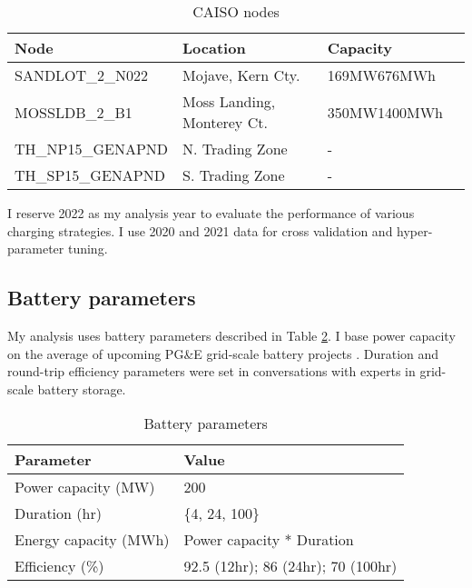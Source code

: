 \documentclass[conference]{IEEEtran}
\begin{document}
\begin{table}[htbp]
    \caption{\label{tab:caiso} CAISO nodes}
    \begin{center}
        \begin{tabular}{llll}
            \hline
            \textbf{Node} & \textbf{Location} & \textbf{Capacity} \\
            \hline
            SANDLOT\_2\_N022 & Mojave, Kern Cty. & 169MW\/676MWh \\
            MOSSLDB\_2\_B1 & Moss Landing, Monterey Ct. & 350MW\/1400MWh \\
            TH\_NP15\_GEN\-APND & N. Trading Zone & - \\
            TH\_SP15\_GEN\-APND & S. Trading Zone & - \\
            \hline
        \end{tabular}
    \end{center}
\end{table}

I reserve 2022 as my analysis year to evaluate the performance of various charging strategies. I use 2020 and 2021 data for cross validation and hyper-parameter tuning.

\subsection{Battery parameters}
My analysis uses battery parameters described in Table \ref{tab:battery}. I base power capacity on the average of upcoming PG\&E grid-scale battery projects \cite{Colthorpe} \cite{IEA}. Duration and round-trip efficiency parameters were set in conversations with experts in grid-scale battery storage. 
\begin{table}[htbp]
    \caption{\label{tab:battery} Battery parameters}
    \begin{center}
        \begin{tabular}{ll}
            \hline
            \textbf{Parameter} & \textbf{Value}\\
            \hline
            Power capacity (MW) & 200\\
            Duration (hr) & \{4, 24, 100\}\\
            Energy capacity (MWh) & Power capacity * Duration \\
            Efficiency (\%) & 92.5 (12hr); 86 (24hr); 70 (100hr)\\
            \hline
        \end{tabular}
    \end{center}
\end{table}
\end{document}
